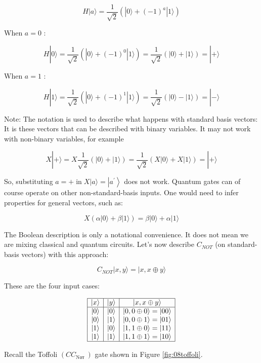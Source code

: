 \documentclass[main.tex]{subfiles}
\begin{document}
    $$
    H|a\rangle=\frac{1}{\sqrt{2}}\left(|0\rangle+(-1)^{a}|1\rangle\right)
    $$
    
    When $a=0$ :
    
    $$
    H|0\rangle=\frac{1}{\sqrt{2}}\left(|0\rangle+(-1)^{0}|1\rangle\right)=\frac{1}{\sqrt{2}}(|0\rangle+|1\rangle)=|+\rangle
    $$
    
    When $a=1$ :
    
    $$
    H|1\rangle=\frac{1}{\sqrt{2}}\left(|0\rangle+(-1)^{1}|1\rangle\right)=\frac{1}{\sqrt{2}}(|0\rangle-|1\rangle)=|-\rangle
    $$
    
    Note: The notation is used to describe what happens with standard basis vectors: It is these vectors that can be described with binary variables. It may not work with non-binary variables, for example
    
    $$
    X|+\rangle=X \frac{1}{\sqrt{2}}(|0\rangle+|1\rangle)=\frac{1}{\sqrt{2}}(X|0\rangle+X|1\rangle)=|+\rangle
    $$
    
    So, substituting $a=+\operatorname{in} X|a\rangle=\left|a^{\prime}\right\rangle$ does not work. Quantum gates can of course operate on other non-standard-basis inputs. One would need to infer properties for general vectors, such as:
    
    $$
    X(\alpha|0\rangle+\beta|1\rangle)=\beta|0\rangle+\alpha|1\rangle
    $$
    
    The Boolean description is only a notational convenience. It does not mean we are mixing classical and quantum circuits. Let's now describe $C_{N O T}$ (on standard-basis vectors) with this approach:
    
    $$
    C_{N O T}|x, y\rangle=|x, x \oplus y\rangle
    $$
    
    These are the four input cases:
    
    $$
    \begin{array}{|c|c|c|}
    \hline|x\rangle & |y\rangle & |x, x \oplus y\rangle \\
    \hline|0\rangle & |0\rangle & |0,0 \oplus 0\rangle=|00\rangle \\
    |0\rangle & |1\rangle & |0,0 \oplus 1\rangle=|01\rangle \\
    |1\rangle & |0\rangle & |1,1 \oplus 0\rangle=|11\rangle \\
    |1\rangle & |1\rangle & |1,1 \oplus 1\rangle=|10\rangle \\
    \hline
    \end{array}
    $$
    
    Recall the Toffoli $\left(C C_{\text {Nот }}\right)$ gate shown in Figure \ref{fig:08toffoli}.
    
\end{document}
